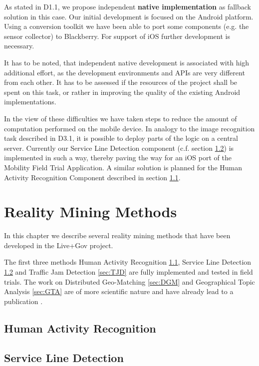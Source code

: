 \documentclass[external]{20120615_deliverable_template_ukob}
\theoremstyle{definition}
\begin{document}
As stated in D1.1, we propose independent {\bf native implementation}
as fallback solution in this case. Our initial development is focused
on the Android platform. Using a conversion toolkit we have been able
to port some components (e.g. the sensor collector) to Blackberry.
For support of iOS further development is necessary.

It has to be noted, that independent native development is associated
with high additional effort, as the development environments and APIs
are very different from each other. It has to be assessed if the
resources of the project shall be spent on this task, or rather in
improving the quality of the existing Android implementations.

In the view of these difficulties we have taken steps to reduce the
amount of computation performed on the mobile device. In analogy to
the image recognition task described in D3.1, it is possible to deploy
parts of the logic on a central server. Currently our Service Line
Detection component (c.f. section \ref{sec:SLD}) is implemented in
such a way, thereby paving the way for an iOS port of the Mobility
Field Trial Application. A similar solution is planned for the Human
Activity Recognition Component described in section \ref{sec:HAR}.


\clearpage
\chapter{Reality Mining Methods}

In this chapter we describe several reality mining methods that have
been developed in the Live+Gov project.

The first three methods Human Activity Recognition \ref{sec:HAR},
Service Line Detection \ref{sec:SLD} and Traffic Jam Detection
\ref{sec:TJD} are fully implemented and tested in field trials.
The work on Distributed Geo-Matching \ref{sec:DGM} and Geographical Topic
Analysis \ref{sec:GTA} are of more scientific nature and have already
lead to a publication \cite{CCK1}.

\section{Human Activity Recognition}
\label{sec:HAR}


\clearpage
\section{Service Line Detection}
\label{sec:SLD}

\end{document}

